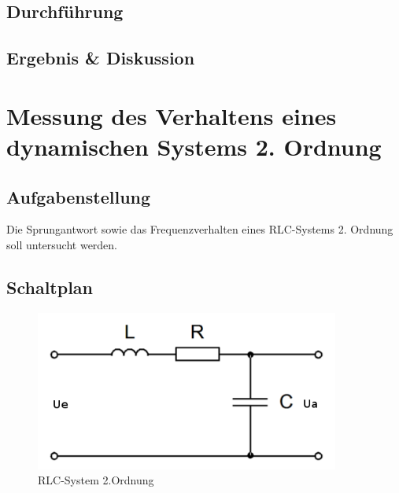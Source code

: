 \documentclass[12pt,a4paper,titlepage]{article}
\begin{document}
\subsection{Durchf\"uhrung}

\subsection{Ergebnis \& Diskussion}

\section{Messung des Verhaltens eines dynamischen Systems 2. Ordnung}

\subsection{Aufgabenstellung}
Die Sprungantwort sowie das Frequenzverhalten eines RLC-Systems 2. Ordnung soll untersucht werden.

\subsection{Schaltplan}
\begin{figure}[H]
  \centering
  \includegraphics[width=100mm]{rlc_schaltplan.png}
  \caption{RLC-System 2.Ordnung}
\end{figure}
\end{document}

